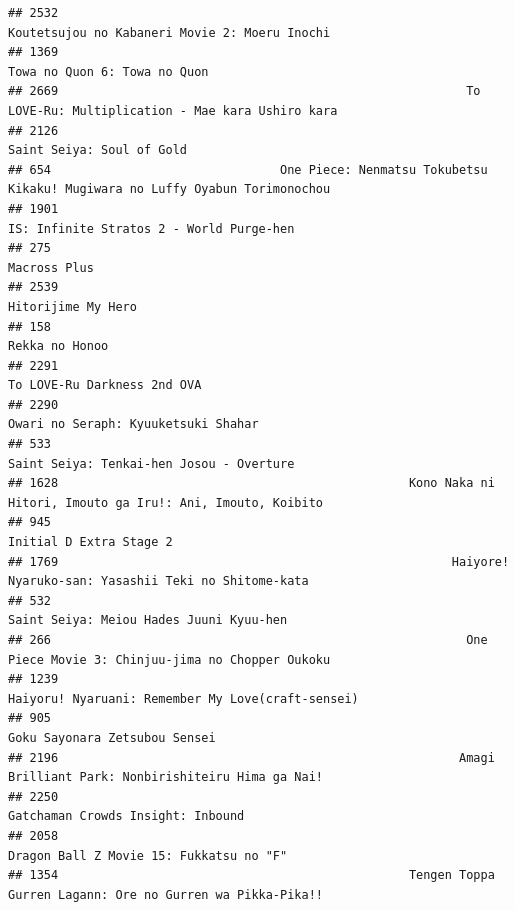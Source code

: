 \documentclass[
]{article}
\begin{document}
\begin{verbatim}
## 2532                                                             Koutetsujou no Kabaneri Movie 2: Moeru Inochi
## 1369                                                                              Towa no Quon 6: Towa no Quon
## 2669                                                         To LOVE-Ru: Multiplication - Mae kara Ushiro kara
## 2126                                                                                 Saint Seiya: Soul of Gold
## 654                                One Piece: Nenmatsu Tokubetsu Kikaku! Mugiwara no Luffy Oyabun Torimonochou
## 1901                                                                  IS: Infinite Stratos 2 - World Purge-hen
## 275                                                                                               Macross Plus
## 2539                                                                                        Hitorijime My Hero
## 158                                                                                             Rekka no Honoo
## 2291                                                                               To LOVE-Ru Darkness 2nd OVA
## 2290                                                                       Owari no Seraph: Kyuuketsuki Shahar
## 533                                                                   Saint Seiya: Tenkai-hen Josou - Overture
## 1628                                                 Kono Naka ni Hitori, Imouto ga Iru!: Ani, Imouto, Koibito
## 945                                                                                    Initial D Extra Stage 2
## 1769                                                       Haiyore! Nyaruko-san: Yasashii Teki no Shitome-kata
## 532                                                                    Saint Seiya: Meiou Hades Juuni Kyuu-hen
## 266                                                          One Piece Movie 3: Chinjuu-jima no Chopper Oukoku
## 1239                                                         Haiyoru! Nyaruani: Remember My Love(craft-sensei)
## 905                                                                              Goku Sayonara Zetsubou Sensei
## 2196                                                        Amagi Brilliant Park: Nonbirishiteiru Hima ga Nai!
## 2250                                                                         Gatchaman Crowds Insight: Inbound
## 2058                                                                   Dragon Ball Z Movie 15: Fukkatsu no "F"
## 1354                                                 Tengen Toppa Gurren Lagann: Ore no Gurren wa Pikka-Pika!!

\end{verbatim}
\end{document}
